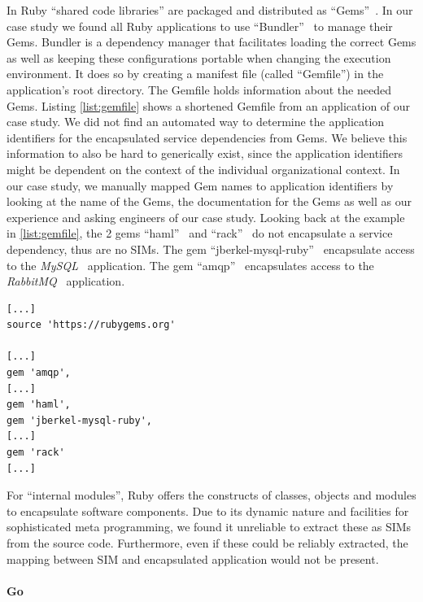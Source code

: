 In Ruby ``shared code libraries'' are packaged and distributed as ``Gems''~\cite{whatisagem}. In our case study we found all Ruby applications to use ``Bundler''~\cite{Bundler} to manage their Gems. Bundler is a dependency manager that facilitates loading the correct Gems as well as keeping these configurations portable when changing the execution environment. It does so by creating a manifest file (called ``Gemfile'') in the application's root directory. The Gemfile holds information about the needed Gems. Listing \ref{list:gemfile} shows a shortened Gemfile from an application of our case study. We did not find an automated way to determine the application identifiers for the encapsulated service dependencies from Gems. We believe this information to also be hard to generically exist, since the application identifiers might be dependent on the context of the individual organizational context. In our case study, we manually mapped Gem names to application identifiers by looking at the name of the Gems, the documentation for the Gems as well as our experience and asking engineers of our case study. Looking back at the example in \autoref{list:gemfile}, the 2 gems ``haml''~\cite{haml} and ``rack''~\cite{rack} do not encapsulate a service dependency, thus are no SIMs. The gem ``jberkel-mysql-ruby''~\cite{jberkel-mysql-ruby} encapsulate access to the \emph{MySQL}~\cite{mysql} application. The gem ``amqp''~\cite{amqp} encapsulates access to the \emph{RabbitMQ}~\cite{rabbitmq} application.

\begin{lstlisting}[caption=Shortened Gemfile from an application of the case study,label=list:gemfile]
[...]
source 'https://rubygems.org'

[...]
gem 'amqp',
[...]
gem 'haml',
gem 'jberkel-mysql-ruby',
[...]
gem 'rack'
[...]
\end{lstlisting}

For ``internal modules'', Ruby offers the constructs of classes, objects and modules to encapsulate software components. Due to its dynamic nature and facilities for sophisticated meta programming, we found it unreliable to extract these as SIMs from the source code. Furthermore, even if these could be reliably extracted, the mapping between SIM and encapsulated application would not be present.

\paragraph{Go}

